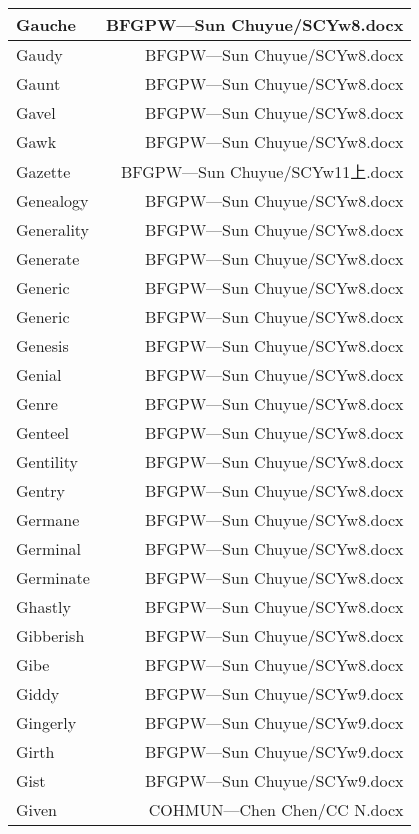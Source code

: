 \documentclass{article}
\begin{document}
\begin{center}
\begin{longtable}{|l|r|}
\hline
Gauche  &  BFGPW---Sun Chuyue/SCYw8.docx\\  
\hline
Gaudy  &  BFGPW---Sun Chuyue/SCYw8.docx\\  
\hline
Gaunt  &  BFGPW---Sun Chuyue/SCYw8.docx\\  
\hline
Gavel  &  BFGPW---Sun Chuyue/SCYw8.docx\\  
\hline
Gawk  &  BFGPW---Sun Chuyue/SCYw8.docx\\  
\hline
Gazette  &  BFGPW---Sun Chuyue/SCYw11上.docx\\  
\hline
Genealogy  &  BFGPW---Sun Chuyue/SCYw8.docx\\  
\hline
Generality  &  BFGPW---Sun Chuyue/SCYw8.docx\\  
\hline
Generate  &  BFGPW---Sun Chuyue/SCYw8.docx\\  
\hline
Generic  &  BFGPW---Sun Chuyue/SCYw8.docx\\  
\hline
Generic  &  BFGPW---Sun Chuyue/SCYw8.docx\\  
\hline
Genesis  &  BFGPW---Sun Chuyue/SCYw8.docx\\  
\hline
Genial  &  BFGPW---Sun Chuyue/SCYw8.docx\\  
\hline
Genre  &  BFGPW---Sun Chuyue/SCYw8.docx\\  
\hline
Genteel  &  BFGPW---Sun Chuyue/SCYw8.docx\\  
\hline
Gentility  &  BFGPW---Sun Chuyue/SCYw8.docx\\  
\hline
Gentry  &  BFGPW---Sun Chuyue/SCYw8.docx\\  
\hline
Germane  &  BFGPW---Sun Chuyue/SCYw8.docx\\  
\hline
Germinal  &  BFGPW---Sun Chuyue/SCYw8.docx\\  
\hline
Germinate  &  BFGPW---Sun Chuyue/SCYw8.docx\\  
\hline
Ghastly  &  BFGPW---Sun Chuyue/SCYw8.docx\\  
\hline
Gibberish  &  BFGPW---Sun Chuyue/SCYw8.docx\\  
\hline
Gibe  &  BFGPW---Sun Chuyue/SCYw8.docx\\  
\hline
Giddy  &  BFGPW---Sun Chuyue/SCYw9.docx\\  
\hline
Gingerly  &  BFGPW---Sun Chuyue/SCYw9.docx\\  
\hline
Girth  &  BFGPW---Sun Chuyue/SCYw9.docx\\  
\hline
Gist  &  BFGPW---Sun Chuyue/SCYw9.docx\\  
\hline
Given  &  COHMUN---Chen Chen/CC N.docx\\  
\hline

\end{longtable}
\end{center}
\end{document}
